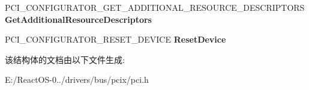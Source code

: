 \begin{DoxyCompactItemize}
P\+C\+I\+\_\+\+C\+O\+N\+F\+I\+G\+U\+R\+A\+T\+O\+R\+\_\+\+G\+E\+T\+\_\+\+A\+D\+D\+I\+T\+I\+O\+N\+A\+L\+\_\+\+R\+E\+S\+O\+U\+R\+C\+E\+\_\+\+D\+E\+S\+C\+R\+I\+P\+T\+O\+RS {\bfseries Get\+Additional\+Resource\+Descriptors}
\item 
\mbox{\label{struct___p_c_i___c_o_n_f_i_g_u_r_a_t_o_r_a8282b18d2d063110db5700d99a4b2d2e}} 
P\+C\+I\+\_\+\+C\+O\+N\+F\+I\+G\+U\+R\+A\+T\+O\+R\+\_\+\+R\+E\+S\+E\+T\+\_\+\+D\+E\+V\+I\+CE {\bfseries Reset\+Device}
\end{DoxyCompactItemize}


该结构体的文档由以下文件生成\+:\begin{DoxyCompactItemize}
\item 
E\+:/\+React\+O\+S-\/0../drivers/bus/pcix/pci.\+h\end{DoxyCompactItemize}
